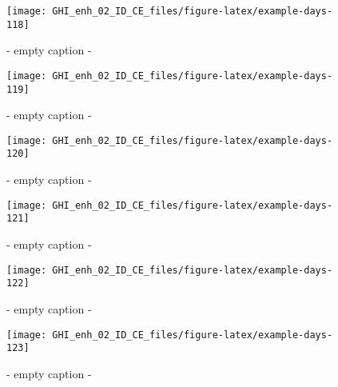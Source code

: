\documentclass[
  10pt,
  a4paper,oneside]{article}
\begin{document}
\begin{figure}[H]

{\centering \texttt{[image: GHI\_enh\_02\_ID\_CE\_files/figure-latex/example-days-118]} 

}

\caption{ - empty caption - }\label{fig:example-days-118}
\end{figure}

\begin{figure}[H]

{\centering \texttt{[image: GHI\_enh\_02\_ID\_CE\_files/figure-latex/example-days-119]} 

}

\caption{ - empty caption - }\label{fig:example-days-119}
\end{figure}

\begin{figure}[H]

{\centering \texttt{[image: GHI\_enh\_02\_ID\_CE\_files/figure-latex/example-days-120]} 

}

\caption{ - empty caption - }\label{fig:example-days-120}
\end{figure}

\begin{figure}[H]

{\centering \texttt{[image: GHI\_enh\_02\_ID\_CE\_files/figure-latex/example-days-121]} 

}

\caption{ - empty caption - }\label{fig:example-days-121}
\end{figure}

\begin{figure}[H]

{\centering \texttt{[image: GHI\_enh\_02\_ID\_CE\_files/figure-latex/example-days-122]} 

}

\caption{ - empty caption - }\label{fig:example-days-122}
\end{figure}

\begin{figure}[H]

{\centering \texttt{[image: GHI\_enh\_02\_ID\_CE\_files/figure-latex/example-days-123]} 

}

\caption{ - empty caption - }\label{fig:example-days-123}
\end{figure}
\end{document}
